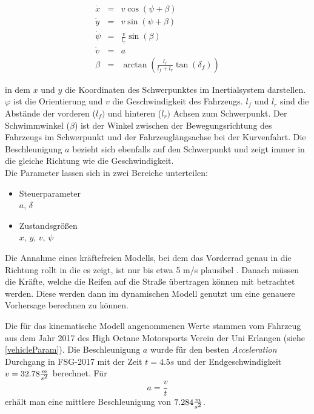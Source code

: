 \documentclass{like}
\begin{document}
\begin{eqnarray}
\label{kinDiscrete}
\dot{x}   &= &v  \cos(\psi + \beta)\\
\dot{y}   &= &v  \sin(\psi + \beta)\\
\dot{\psi} &= &\frac{v}{l_r} \sin(\beta) \\
\dot{v}    &= &a \\
\beta      &= &\arctan(\frac{l_r}{l_f + l_r} \tan(\delta_f))
\end{eqnarray}

in dem \(x\) und \(y\) die Koordinaten des Schwerpunktes im Inertialsystem darstellen. 
\(\varphi\) ist die Orientierung und \(v\) die Geschwindigkeit des Fahrzeugs. \(l_f\) und \(l_r\) sind die Abstände der vorderen (\(l_f)\) und hinteren (\(l_r)\) Achsen zum Schwerpunkt.
Der Schwimmwinkel (\(\beta\)) ist der Winkel  zwischen der Bewegungsrichtung des Fahrzeugs im Schwerpunkt und der Fahrzeuglängsachse bei der Kurvenfahrt. Die Beschleunigung \(a\) bezieht sich ebenfalls auf den Schwerpunkt und zeigt immer in die gleiche Richtung wie die Geschwindigkeit. \\
Die Parameter lassen sich in zwei Bereiche unterteilen:

\begin{itemize}
	\item Steuerparameter  \\
	\(a\), \(\delta\)
	\item Zustandsgrößen \\
	\(x\), \(y\), \(v\), \(\psi\)
	
\end{itemize}


Die Annahme eines kräftefreien Modells, bei dem das Vorderrad genau in die Richtung rollt in die es zeigt, ist nur bis etwa 5 m/s plausibel \cite{rajamani2011vehicle}. Danach müssen die Kräfte, welche die Reifen auf die Straße übertragen können mit betrachtet werden. Diese werden dann im dynamischen Modell genutzt um eine genauere Vorhersage berechnen zu können.

Die für das kinematische Modell angenommenen Werte stammen vom Fahrzeug aus dem Jahr 2017 des High Octane Motorsports Verein der Uni Erlangen (siehe \ref{vehicleParam}). Die Beschleunigung \(a\) wurde für den besten \textit{Acceleration} Durchgang in FSG-2017 mit der Zeit $t = 4.5s$ und der Endgeschwindigkeit $v = 32.78 \frac{m}{s\textsuperscript{2}}$ berechnet. Für 
\begin{equation}
a = \frac{v}{t}  \label{long_acc_kin}
\end{equation}
erhält man eine mittlere Beschleunigung von $7.284 \frac{m}{s\textsuperscript{2}} $.
\end{document}
